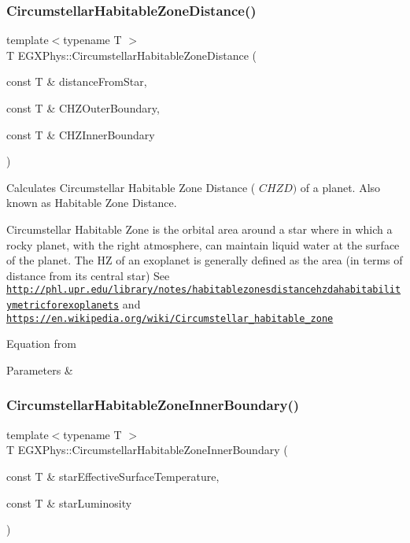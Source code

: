 \subsubsection{\texorpdfstring{Circumstellar\+Habitable\+Zone\+Distance()}{CircumstellarHabitableZoneDistance()}}
{\footnotesize\ttfamily template$<$typename T $>$ \\
T E\+G\+X\+Phys\+::\+Circumstellar\+Habitable\+Zone\+Distance (\begin{DoxyParamCaption}\item[{const T \&}]{distance\+From\+Star,  }\item[{const T \&}]{C\+H\+Z\+Outer\+Boundary,  }\item[{const T \&}]{C\+H\+Z\+Inner\+Boundary }\end{DoxyParamCaption})}



Calculates Circumstellar Habitable Zone Distance ( $CHZD)$ of a planet. Also known as Habitable Zone Distance. 

Circumstellar Habitable Zone is the orbital area around a star where in which a rocky planet, with the right atmosphere, can maintain liquid water at the surface of the planet. The HZ of an exoplanet is generally defined as the area (in terms of distance from its central star) See \href{http://phl.upr.edu/library/notes/habitablezonesdistancehzdahabitabilitymetricforexoplanets}{\tt http\+://phl.\+upr.\+edu/library/notes/habitablezonesdistancehzdahabitabilitymetricforexoplanets} and \href{https://en.wikipedia.org/wiki/Circumstellar_habitable_zone}{\tt https\+://en.\+wikipedia.\+org/wiki/\+Circumstellar\+\_\+habitable\+\_\+zone}

Equation from 
\begin{DoxyParams}{Parameters}
{\em } & \\
\hline
\end{DoxyParams}
\mbox{\label{group___astrophysics_ga9ee2e8023cb444aa4638c962788b5853}} 
\subsubsection{\texorpdfstring{Circumstellar\+Habitable\+Zone\+Inner\+Boundary()}{CircumstellarHabitableZoneInnerBoundary()}}
{\footnotesize\ttfamily template$<$typename T $>$ \\
T E\+G\+X\+Phys\+::\+Circumstellar\+Habitable\+Zone\+Inner\+Boundary (\begin{DoxyParamCaption}\item[{const T \&}]{star\+Effective\+Surface\+Temperature,  }\item[{const T \&}]{star\+Luminosity }\end{DoxyParamCaption})}



